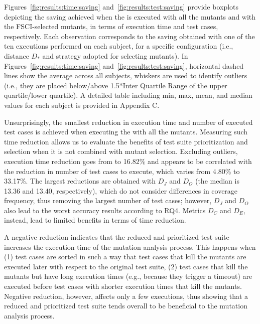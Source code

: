 Figures~\ref{fig:results:time:saving} and~\ref{fig:results:test:saving} provide boxplots depicting
the saving achieved when the \MPTS is executed with all the mutants and with the FSCI-selected mutants, in terms of execution time and test cases, respectively. Each observation corresponds to the saving obtained with one of the ten executions performed on each subject, for a specific configuration (i.e., distance $D_*$ and strategy adopted for selecting mutants). In Figures~\ref{fig:results:time:saving} and~\ref{fig:results:test:saving}, horizontal dashed lines show the average across all subjects, whiskers are used to identify outliers (i.e., they are placed below/above 1.5*Inter Quartile Range of the upper quartile/lower quartile). A detailed table including min, max, mean, and median values for each subject is provided in Appendix C.


Unsurprisingly, the smallest reduction in execution time and number of executed test cases is achieved when executing the \MPTS with all the mutants.
Measuring such time reduction allows us to evaluate the benefits of test suite prioritization and selection when it is not combined with mutant selection.
Excluding outliers, execution time reduction goes from   %
to 16.82\% and appears to be correlated with the reduction in number of test cases to execute, which varies from 4.80\% to 33.17\%.
The largest reductions are obtained with $D_J$ and $D_O$ (the median is 13.36 and 13.40, respectively), which do not consider differences in coverage frequency, thus removing the largest number of test cases; however, $D_J$ and $D_O$ also lead to the worst accuracy results according to RQ4. Metrics $D_C$ and $D_E$, instead, lead to limited benefits in terms of time reduction.

A negative reduction indicates that the reduced and prioritized test suite increases the execution time of the mutation analysis process. This happens when (1) test cases are sorted in such a way that test cases that kill the mutants are executed later with respect to the original test suite, (2) test cases that kill the mutants but have long execution times (e.g., because they trigger a timeout) are executed before test cases with shorter execution times that kill the mutants. Negative reduction, however, affects only a few executions, thus showing that a reduced and prioritized test suite tends overall to be beneficial to the mutation analysis process.



